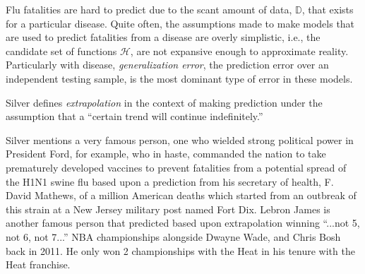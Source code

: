 \documentclass[12pt]{article}
\begin{document}
\begin{enumerate}


\begin{tcolorbox}[colback=white, sharp corners]
Flu fatalities are hard to predict due to the scant amount of data, $\mathbb{D}$, that exists for a particular disease. Quite often, the assumptions made to make models that are used to predict fatalities from a disease are overly simplistic, i.e., the candidate set of functions $\mathcal{H}$, are not expansive enough to approximate reality. Particularly with disease, \emph{generalization error}, the prediction error over an independent testing sample, is the most dominant type of error in these models.
\end{tcolorbox}



\begin{tcolorbox}[colback=white, sharp corners]
Silver defines \emph{extrapolation} in the context of making prediction under the assumption that a ``certain trend will continue indefinitely.''
\end{tcolorbox}



\begin{tcolorbox}[colback=white, sharp corners]
Silver mentions a very famous person, one who wielded strong political power in President Ford, for example, who in haste, commanded the nation to take prematurely developed vaccines to prevent fatalities from a potential spread of the H1N1 swine flu based upon a prediction from his secretary of health, F. David Mathews, of a million American deaths which started from an outbreak of this strain at a New Jersey military post named Fort Dix. Lebron James is another famous person that predicted based upon extrapolation winning ``...not 5, not 6, not 7...'' NBA championships alongside Dwayne Wade, and Chris Bosh back in 2011. He only won 2 championships with the Heat in his tenure with the Heat franchise.
\end{tcolorbox}



\end{enumerate}
\end{document}
